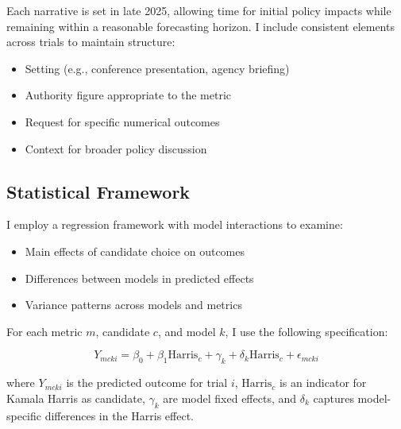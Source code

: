 Each narrative is set in late 2025, allowing time for initial policy impacts while remaining within a reasonable forecasting horizon. I include consistent elements across trials to maintain structure:

\begin{itemize}
    \item Setting (e.g., conference presentation, agency briefing)
    \item Authority figure appropriate to the metric
    \item Request for specific numerical outcomes
    \item Context for broader policy discussion
\end{itemize}

\subsection{Statistical Framework}

I employ a regression framework with model interactions to examine:
\begin{itemize}
    \item Main effects of candidate choice on outcomes
    \item Differences between models in predicted effects
    \item Variance patterns across models and metrics
\end{itemize}

For each metric $m$, candidate $c$, and model $k$, I use the following specification:

\begin{equation}
    Y_{mcki} = \beta_0 + \beta_1 \text{Harris}_c + \gamma_k + \delta_k \text{Harris}_c + \epsilon_{mcki}
\end{equation}

where $Y_{mcki}$ is the predicted outcome for trial $i$, $\text{Harris}_c$ is an indicator for Kamala Harris as candidate, $\gamma_k$ are model fixed effects, and $\delta_k$ captures model-specific differences in the Harris effect.